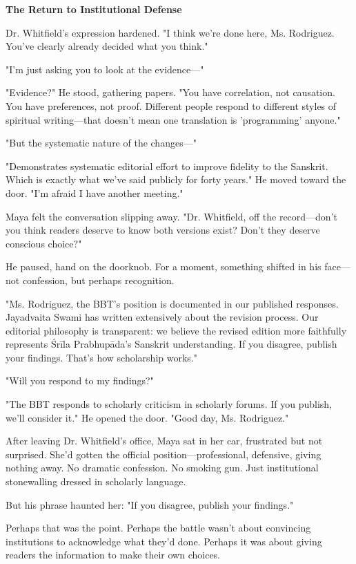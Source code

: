 \documentclass[12pt,twoside]{book}
\begin{document}
\textbf{\textbf{The Return to Institutional Defense}}

Dr. Whitfield's expression hardened. "I think we're done here, Ms. Rodriguez. You've clearly already decided what you think."

"I'm just asking you to look at the evidence—"

"Evidence?" He stood, gathering papers. "You have correlation, not causation. You have preferences, not proof. Different people respond to different styles of spiritual writing—that doesn't mean one translation is 'programming' anyone."

"But the systematic nature of the changes—"

"Demonstrates systematic editorial effort to improve fidelity to the Sanskrit. Which is exactly what we've said publicly for forty years." He moved toward the door. "I'm afraid I have another meeting."

Maya felt the conversation slipping away. "Dr. Whitfield, off the record—don't you think readers deserve to know both versions exist? Don't they deserve conscious choice?"

He paused, hand on the doorknob. For a moment, something shifted in his face—not confession, but perhaps recognition.

"Ms. Rodriguez, the BBT's position is documented in our published responses. Jayadvaita Swami has written extensively about the revision process. Our editorial philosophy is transparent: we believe the revised edition more faithfully represents Śrīla Prabhupāda's Sanskrit understanding. If you disagree, publish your findings. That's how scholarship works."

"Will you respond to my findings?"

"The BBT responds to scholarly criticism in scholarly forums. If you publish, we'll consider it." He opened the door. "Good day, Ms. Rodriguez."

After leaving Dr. Whitfield's office, Maya sat in her car, frustrated but not surprised. She'd gotten the official position—professional, defensive, giving nothing away. No dramatic confession. No smoking gun. Just institutional stonewalling dressed in scholarly language.

But his phrase haunted her: "If you disagree, publish your findings."

Perhaps that was the point. Perhaps the battle wasn't about convincing institutions to acknowledge what they'd done. Perhaps it was about giving readers the information to make their own choices.
\end{document}
